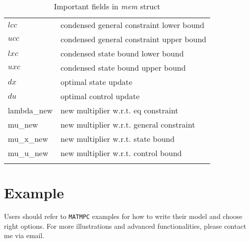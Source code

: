 \documentclass{article}
\newcommand{\software}[1]{{\tt#1}}
\newcommand{\alert}[1]{{\textit{#1}}}
\begin{document}
\begin{longtable}{l|l}
		$lcc$ & condensed general constraint lower bound  \\
		$ucc$ & condensed general constraint upper bound  \\
		$lxc$ & condensed state bound lower bound         \\
		$uxc$ & condensed state bound upper bound         \\\hline
		$dx$ & optimal state update                      \\
		$du$ & optimal control update                    \\
		lambda\_new & new multiplier w.r.t. eq constraint       \\
		mu\_new & new multiplier w.r.t. general constraint  \\
		mu\_x\_new & new multiplier w.r.t. state bound         \\
		mu\_u\_new & new multiplier w.r.t. control bound       \\
		\hline
	\caption{Important fields in \alert{mem} struct}
	\label{table:mem}
\end{longtable}

\section{Example}
Users should refer to \software{MATMPC} examples for how to write their model and choose right options. For more illustrations and advanced functionalities, please contact me via email.



\end{document}
